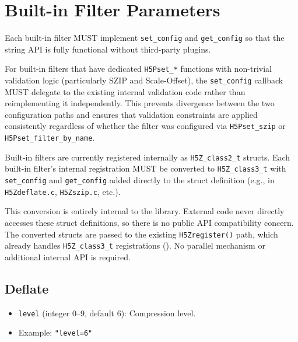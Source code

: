 \documentclass[../HDF5_RFC.tex]{subfiles}
\begin{document}
\section{Built-in Filter Parameters}
\label{sec:builtin-filters}

Each built-in filter MUST implement \texttt{set\_config} and \texttt{get\_config} so that the
string API is fully functional without third-party plugins.

For built-in filters that have dedicated \texttt{H5Pset\_*} functions with non-trivial
validation logic (particularly SZIP and Scale-Offset), the \texttt{set\_config}
callback MUST delegate to the existing internal validation code rather than
reimplementing it independently. This prevents divergence between the two
configuration paths and ensures that validation constraints are applied
consistently regardless of whether the filter was configured via
\texttt{H5Pset\_szip} or \texttt{H5Pset\_filter\_by\_name}.

Built-in filters are currently registered internally as \texttt{H5Z\_class2\_t}
structs. Each built-in filter's internal registration MUST be converted to
\texttt{H5Z\_class3\_t} with \texttt{set\_config} and \texttt{get\_config} added directly to the
struct definition (e.g., in \texttt{H5Zdeflate.c}, \texttt{H5Zszip.c}, etc.).

This conversion is entirely internal to the library. External code never
directly accesses these struct definitions, so there is no public API
compatibility concern. The converted structs are passed to the existing
\texttt{H5Zregister()} path, which already handles \texttt{H5Z\_class3\_t} registrations
(). No parallel mechanism or additional internal API is
required.

\subsection{Deflate}

\begin{itemize}
\item \texttt{level} (integer 0--9, default 6): Compression level.
\item Example: \texttt{"level=6"}
\end{itemize}
\end{document}

